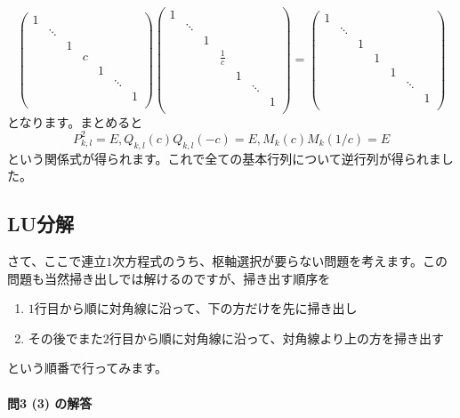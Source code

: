 \[
\begin{pmatrix}
1 & & \\
 & \ddots & \\
 & & 1 \\
 & & & c \\
 & & & & 1 \\
 & & & & & \ddots \\
 & & & & & & 1 \\
\end{pmatrix}
\begin{pmatrix}
1 & & \\
 & \ddots & \\
 & & 1 \\
 & & & \frac{1}{c} \\
 & & & & 1 \\
 & & & & & \ddots \\
 & & & & & & 1 \\
\end{pmatrix}
=
\begin{pmatrix}
1 & & \\
 & \ddots & \\
 & & 1 \\
 & & & 1 \\
 & & & & 1 \\
 & & & & & \ddots \\
 & & & & & & 1 \\
\end{pmatrix}
\]
となります。まとめると
\[
P_{k,l}^2 = E, Q_{k, l}(c)Q_{k, l}(-c) = E, M_k(c)M_k(1/c) = E
\]
という関係式が得られます。これで全ての基本行列について逆行列が得られました。

\subsection{LU分解}

さて、ここで連立$1$次方程式のうち、枢軸選択が要らない問題を考えます。この問題も当然掃き出しでは解けるのですが、掃き出す順序を
\begin{enumerate}
\item $1$行目から順に対角線に沿って、下の方だけを先に掃き出し
\item その後でまた$2$行目から順に対角線に沿って、対角線より上の方を掃き出す
\end{enumerate}
という順番で行ってみます。

\paragraph{問3 (3) の解答}


